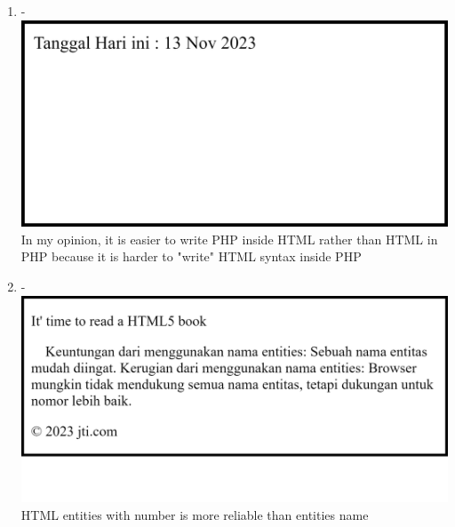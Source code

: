 \documentclass[12pt,titlepage]{article}
\begin{document}
\begin{enumerate}
    \item - \\ \includegraphics[width=.9\textwidth]{images/figures/fig17.png} \\ In my opinion, it is easier to write PHP inside HTML rather than HTML in PHP because it is harder to "write" HTML syntax inside PHP
    \item - \\ \includegraphics[width=.9\textwidth]{images/figures/fig18.png} \\ HTML entities with number is more reliable than entities name
    
    \newpage
    

\end{enumerate}
\end{document}

